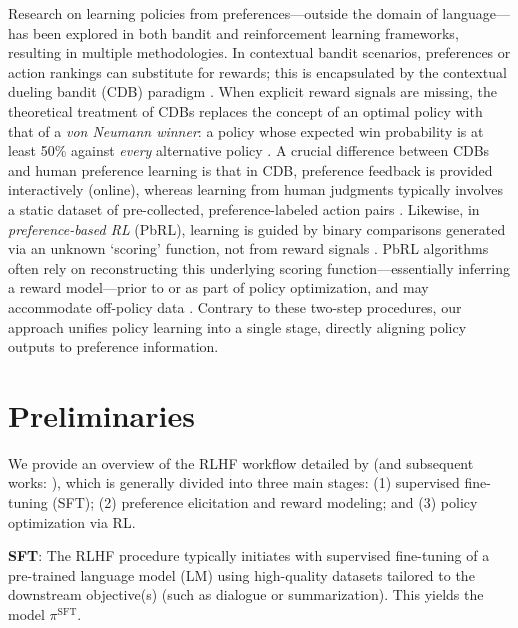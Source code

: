 Research on learning policies from preferences—outside the domain of language—has been explored in both bandit and reinforcement learning frameworks, resulting in multiple methodologies. In contextual bandit scenarios, preferences or action rankings can substitute for rewards; this is encapsulated by the contextual dueling bandit (CDB) paradigm \citep{yue2012karmed,dudik2015contextual}. When explicit reward signals are missing, the theoretical treatment of CDBs replaces the concept of an optimal policy with that of a \textit{von Neumann winner}: a policy whose expected win probability is at least 50\% against \textit{every} alternative policy \citep{dudik2015contextual}. A crucial difference between CDBs and human preference learning is that in CDB, preference feedback is provided interactively (online), whereas learning from human judgments typically involves a static dataset of pre-collected, preference-labeled action pairs \citep{yan2022human}. Likewise, in \textit{preference-based RL} (PbRL), learning is guided by binary comparisons generated via an unknown `scoring' function, not from reward signals \citep{BusaFekete2014,ruiz2023dueling}. PbRL algorithms often rely on reconstructing this underlying scoring function—essentially inferring a reward model—prior to or as part of policy optimization, and may accommodate off-policy data \citep{jain2013learning,BusaFekete2014,christiano2017deep,sadigh2017active,kupcsik2018learning}. Contrary to these two-step procedures, our approach unifies policy learning into a single stage, directly aligning policy outputs to preference information.

\section{Preliminaries}\label{section:prelims}

We provide an overview of the RLHF workflow detailed by \citeauthor{ziegler2020finetuning} (and subsequent works: \citep{stiennon2022learning, bai2022training, ouyang2022training}), which is generally divided into three main stages: (1) supervised fine-tuning (SFT); (2) preference elicitation and reward modeling; and (3) policy optimization via RL.

\textbf{SFT}: The RLHF procedure typically initiates with supervised fine-tuning of a pre-trained language model (LM) using high-quality datasets tailored to the downstream objective(s) (such as dialogue or summarization). This yields the model $\pi^\text{SFT}$.

